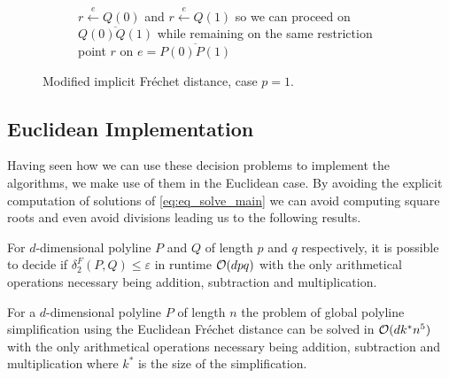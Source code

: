 \begin{figure}
\begin{subfigure}[b]{0.3\textwidth}
        \caption{\(r \overset e\leftarrow Q(0)\) and \(r \overset e\leftarrow Q(1)\) so we can proceed on \(\overline{Q(0)Q(1)}\) while remaining on the same restriction point \(r\) on \(e = \overline{P(0)P(1)}\)}
    \end{subfigure}

    \caption{Modified implicit Fréchet distance, case \(p = 1\).}
    \label{fig:alat_godau_implicit_eq}
\end{figure}



\subsection{Euclidean Implementation}
Having seen how we can use these decision problems to implement the algorithms, we make use of them in the Euclidean case. By avoiding the explicit computation of solutions of \cref{eq:eq_solve_main} we can avoid computing square roots and even avoid divisions leading us to the following results. 

\begin{theorem}
  For \(d\)-dimensional polyline \(P\) and \(Q\) of length \(p\) and \(q\) respectively, it is possible to decide if \(\delta_2^F(P, Q) \leq \varepsilon\) in runtime \(\mathcal{O}(d p q)\) with the only arithmetical operations necessary being addition, subtraction and multiplication. 
\end{theorem}

\begin{theorem}\label{thm:euclidean_implicit_simplification_simple}
  For a \(d\)-dimensional polyline \(P\) of length \(n\) the problem of global polyline simplification using the Euclidean Fréchet distance can be solved in \(\mathcal{O}(d k^*n^5)\) with the only arithmetical operations necessary being addition, subtraction and multiplication where \(k^*\) is the size of the simplification.
\end{theorem}

